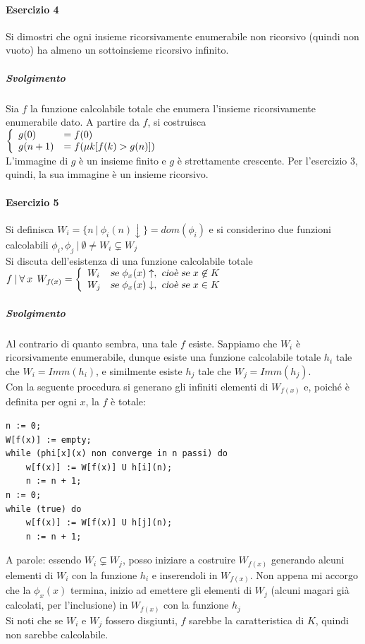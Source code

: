 \documentclass[10pt]{book}
\begin{document}
\paragraph{Esercizio 4} Si dimostri che ogni insieme ricorsivamente enumerabile non ricorsivo (quindi non vuoto) ha almeno un sottoinsieme ricorsivo infinito.
\subparagraph{Svolgimento} Sia $f$ la funzione calcolabile totale che enumera l'insieme ricorsivamente enumerabile dato. A partire da $f$, si costruisca $\left\{\begin{array}{l l}
g(0) & = f(0)\\
g(n + 1) & = f(\mu k[f(k)>g(n)])
\end{array}\right.$\\
L'immagine di $g$ è un insieme finito e $g$ è strettamente crescente. Per l'esercizio 3, quindi, la sua immagine è un insieme ricorsivo.
\paragraph{Esercizio 5} Si definisca $W_i=\{n\:|\:\phi_i(n)\downarrow\} = dom(\phi_i)$ e si considerino due funzioni calcolabili $\phi_i,\phi_j\:|\:\emptyset\neq W_i \subsetneq W_j$\\Si discuta dell'esistenza di una funzione calcolabile totale $f\:|\:\forall\:x\:\:W_{f(x)} = \left\{ \begin{array}{l l}
W_i&\textsl{se }\phi_x(x)\uparrow,\textsl{ cioè se }x\not\in K\\
W_j&\textsl{se }\phi_x(x)\downarrow,\textsl{ cioè se }x\in K
\end{array} \right.$
\subparagraph{Svolgimento} Al contrario di quanto sembra, una tale $f$ esiste. Sappiamo che $W_i$ è ricorsivamente enumerabile, dunque esiste una funzione calcolabile totale $h_i$ tale che $W_i = Imm(h_i)$, e similmente esiste $h_j$ tale che $W_j = Imm(h_j)$.\\
Con la seguente procedura si generano gli infiniti elementi di $W_{f(x)}$ e, poiché è definita per ogni $x$, la $f$ è totale:
\begin{lstlisting}
n := 0;
W[f(x)] := empty;
while (phi[x](x) non converge in n passi) do
	w[f(x)] := W[f(x)] U h[i](n);
	n := n + 1;
n := 0;
while (true) do
	w[f(x)] := W[f(x)] U h[j](n);
	n := n + 1;
\end{lstlisting}
A parole: essendo $W_i \subsetneq W_j$, posso iniziare a costruire $W_{f(x)}$ generando alcuni elementi di $W_i$ con la funzione $h_i$ e inserendoli in $W_{f(x)}$. Non appena mi accorgo che la $\phi_x(x)$ termina, inizio ad emettere gli elementi di $W_j$ (alcuni magari già calcolati, per l'inclusione) in $W_{f(x)}$ con la funzione $h_j$\\
Si noti che se $W_i$ e $W_j$ fossero disgiunti, $f$ sarebbe la caratteristica di $K$, quindi non sarebbe calcolabile.
\end{document}
